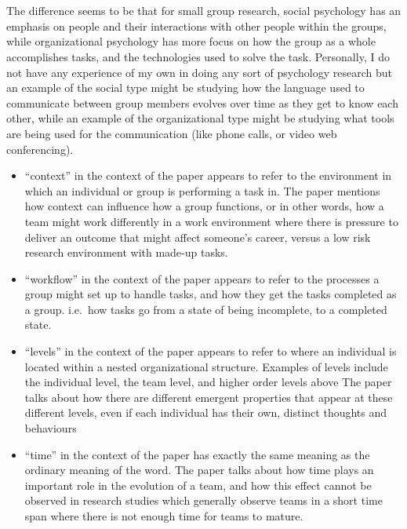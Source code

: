 \documentclass[letterpaper,12pt]{article}
\begin{document}
  \setcounter{section}{0}
  \section{}
  The difference seems to be that for small group research, social psychology has an emphasis on
  people and their interactions with other people within the groups, while organizational psychology
  has more focus on how the group as a whole accomplishes tasks, and the technologies used to solve the task.
  Personally, I do not have any experience of my own in doing any sort of psychology research but an
  example of the social type might be studying how the language used to communicate between group members
  evolves over time as they get to know each other, while an example of the organizational type might be
  studying what tools are being used for the communication (like phone calls, or video web conferencing).

  \begin{itemize}
    \item ``context'' in the context of the paper appears to refer to the
environment in which an individual or group is  performing a task in. The paper
mentions how context can influence how a group functions, or in other words, how
a team might work differently in a work environment where there is pressure to
deliver an outcome that might affect someone's career, versus a low risk
research environment with made-up tasks.
    \item ``workflow'' in the context of the paper appears to refer to the
          processes a group might set up to handle tasks, and how they get the tasks
          completed as a group. i.e.\ how tasks go from a state of being incomplete, to a
          completed state.
    \item ``levels'' in the context of the paper appears to refer to where an individual is located within a nested
          organizational structure. Examples of levels include the individual level, the team level, and higher order levels above
          The paper talks about how there are different emergent properties that appear at these different levels, even if
          each individual has their own, distinct thoughts and behaviours
    \item ``time'' in the context of the paper has exactly the same meaning as the ordinary meaning of the word. The paper
          talks about how time plays an important role in the evolution of a team, and how this effect cannot be observed in
          research studies which generally observe teams in a short time span where there is not enough time for teams to mature.
  \end{itemize}
\end{document}
